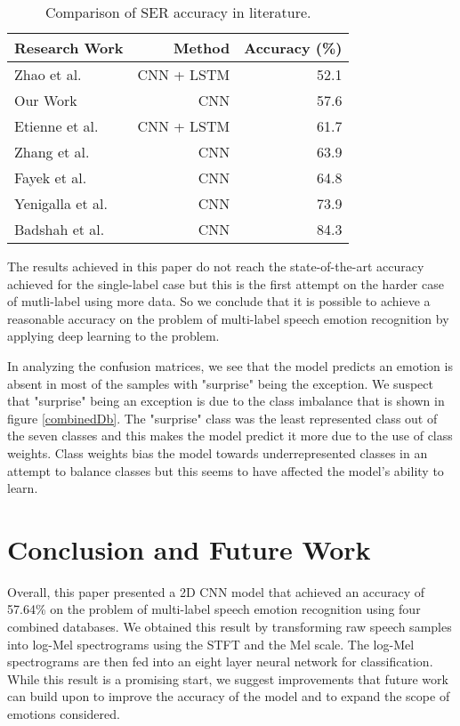 \begin{table}
	\centering
	\caption{Comparison of SER accuracy in literature.}
	\label{litacccompare}
	\begin{tabular}{@{}lrr@{}}
		\toprule
		Research Work & Method & Accuracy (\%) \\
		\midrule
		Zhao et al. \cite{Zhao2019} & CNN + LSTM & 52.1 \\
		Our Work & CNN & 57.6 \\
		Etienne et al. \cite{Etienne2018} & CNN + LSTM & 61.7 \\
		Zhang et al. \cite{Zhang2019} & CNN & 63.9 \\
		Fayek et al. \cite{Fayek2017} & CNN & 64.8 \\
		Yenigalla et al. \cite{Yenigalla2018} & CNN & 73.9 \\
		Badshah et al. \cite {Badshah2019} & CNN & 84.3 \\
		\bottomrule
	\end{tabular}
\end{table}

The results achieved in this paper do not reach the state-of-the-art accuracy achieved for the single-label case but this is the first attempt on the harder case of mutli-label using more data. So we conclude that it is possible to achieve a reasonable accuracy on the problem of multi-label speech emotion recognition by applying deep learning to the problem. 

In analyzing the confusion matrices, we see that the model predicts an emotion is absent in most of the samples with "surprise" being the exception. We suspect that "surprise" being an exception is due to the class imbalance that is shown in figure \ref{combinedDb}. The "surprise" class was the least represented class out of the seven classes and this makes the model predict it more due to the use of class weights. Class weights bias the model towards underrepresented classes in an attempt to balance classes but this seems to have affected the model's ability to learn.

\section{Conclusion and Future Work}

Overall, this paper presented a 2D CNN model that achieved an accuracy of 57.64\% on the problem of multi-label speech emotion recognition using four combined databases. We obtained this result by transforming raw speech samples into log-Mel spectrograms using the STFT and the Mel scale. The log-Mel spectrograms are then fed into an eight layer neural network for classification. While this result is a promising start, we suggest improvements that future work can build upon to improve the accuracy of the model and to expand the scope of emotions considered.

